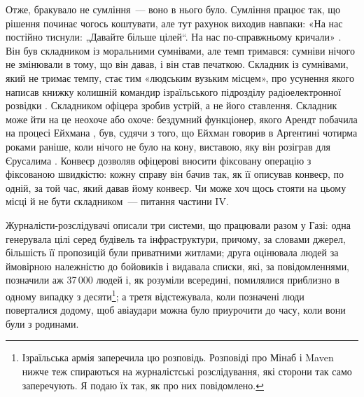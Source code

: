 Отже, бракувало не сумління~— воно в нього було. Сумління працює так, що рішення починає чогось коштувати, але тут рахунок виходив навпаки: «На нас постійно тиснули: „Давайте більше цілей“. На нас по-справжньому кричали» \autocite{abraham2024lavender}. Він був складником із моральними сумнівами, але темп тримався: сумніви нічого не змінювали в тому, що він давав, і він став печаткою. Складник із сумнівами, який не тримає темпу, стає тим «людським вузьким місцем», про усунення якого написав книжку колишній командир ізраїльського підрозділу радіоелектронної розвідки \autocite{ys2021humanmachine}. Складником офіцера зробив устрій, а не його ставлення. Складник може йти на це неохоче або охоче: бездумний функціонер, якого Арендт побачила на процесі Ейхмана \autocite{arendt1963eichmann}, був, судячи з того, що Ейхман говорив в Аргентині чотирма роками раніше, коли нічого не було на кону, виставою, яку він розіграв для Єрусалима \autocite{stangneth2014eichmann}. Конвеєр дозволяв офіцерові вносити фіксовану операцію з фіксованою швидкістю: кожну справу він бачив так, як її описував конвеєр, по одній, за той час, який давав йому конвеєр. Чи може хоч щось стояти на цьому місці й не бути складником~— питання частини IV.

Журналісти-розслідувачі описали три системи, що працювали разом у Газі: одна генерувала цілі серед будівель та інфраструктури, причому, за словами джерел, більшість її пропозицій були приватними житлами; друга оцінювала людей за ймовірною належністю до бойовиків і видавала списки, які, за повідомленнями, позначили аж 37\,000 людей і, як розуміли всередині, помилялися приблизно в одному випадку з десяти\footnote{Ізраїльська армія заперечила цю розповідь. Розповіді про Мінаб і Maven нижче теж спираються на журналістські розслідування, які сторони так само заперечують. Я подаю їх так, як про них повідомлено.}; а третя відстежувала, коли позначені люди поверталися додому, щоб авіаудари можна було приурочити до часу, коли вони були з родинами.


